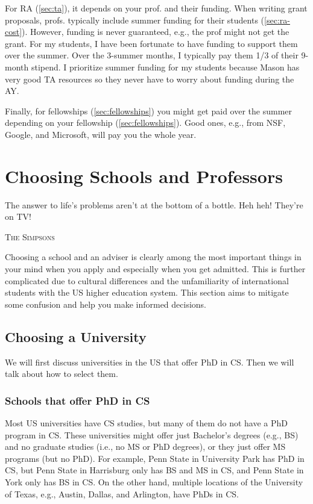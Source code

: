 \documentclass[oneside,11pt,dvipsnames]{book}
\begin{document}
For RA (\autoref{sec:ta}), it depends on your prof. and their funding. When writing grant proposals, profs. typically include summer funding for their students (\autoref{sec:ra-cost}). However, funding is never guaranteed, e.g., the prof might not get the grant.
For my students, I have been fortunate to have funding to support them over the summer. Over the 3-summer months, I typically pay them 1/3 of their 9-month stipend. I prioritize summer funding for my students because Mason has very good TA resources so they never have to worry about funding during the AY.

Finally, for fellowships (\autoref{sec:fellowships}) you might get paid over the summer depending on your fellowship (\autoref{sec:fellowships}). Good ones, e.g., from NSF, Google, and Microsoft, will pay you the whole year.




\chapter{Choosing Schools and Professors}\label{sec:schoolsandprofs}

\epigraph{\vspace{-0.2in} The answer to life's problems aren't at the bottom of a bottle. Heh heh! They're on TV!}{\textsc{The Simpsons}}


Choosing a school and an adviser is clearly among the most important things in your mind when you apply and especially when you get admitted.  This is further complicated due to cultural differences and the unfamiliarity of international students with the US higher education system.  This section aims to mitigate some confusion and help you make informed decisions.

\section{Choosing a University}\label{sec:choosing-university}

We will first discuss universities in the US that offer PhD in CS. Then we will talk about how to select them.

\subsection{Schools that offer PhD in CS}

Most US universities have CS studies, but many of them do not have a PhD program in CS. These universities might offer just Bachelor's degrees (e.g., BS) and no graduate studies (i.e., no MS or PhD degrees), or they just offer MS programs (but no PhD). For example, Penn State in University Park has PhD in CS,  but Penn State in Harrisburg only has BS and MS in CS, and Penn State in York only has BS in CS.  On the other hand, multiple locations of the University of Texas, e.g., Austin, Dallas, and Arlington, have PhDs in CS.
\end{document}
